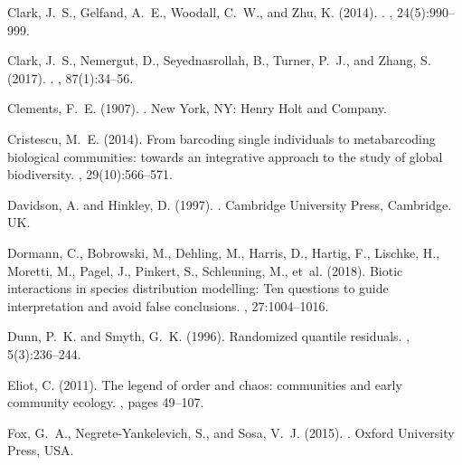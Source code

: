 \documentclass[a4paper,11pt]{article}
\begin{document}
\begin{thebibliography}{}
Clark, J.~S., Gelfand, A.~E., Woodall, C.~W., and Zhu, K. (2014).
.
, 24(5):990--999.

Clark, J.~S., Nemergut, D., Seyednasrollah, B., Turner, P.~J., and Zhang, S.
  (2017).
.
, 87(1):34--56.

Clements, F.~E. (1907).
.
\newblock New York, NY: Henry Holt and Company.

Cristescu, M.~E. (2014).
\newblock From barcoding single individuals to metabarcoding biological
  communities: towards an integrative approach to the study of global
  biodiversity.
, 29(10):566--571.

Davidson, A. and Hinkley, D. (1997).
.
\newblock Cambridge University Press, Cambridge. UK.

Dormann, C., Bobrowski, M., Dehling, M., Harris, D., Hartig, F., Lischke, H.,
  Moretti, M., Pagel, J., Pinkert, S., Schleuning, M., et~al. (2018).
\newblock Biotic interactions in species distribution modelling: Ten questions
  to guide interpretation and avoid false conclusions.
, 27:1004--1016.

Dunn, P.~K. and Smyth, G.~K. (1996).
\newblock Randomized quantile residuals.
,
  5(3):236--244.

Eliot, C. (2011).
\newblock The legend of order and chaos: communities and early community
  ecology.
, pages 49--107.

Fox, G.~A., Negrete-Yankelevich, S., and Sosa, V.~J. (2015).
.
\newblock Oxford University Press, USA.


\end{thebibliography}
\end{document}
